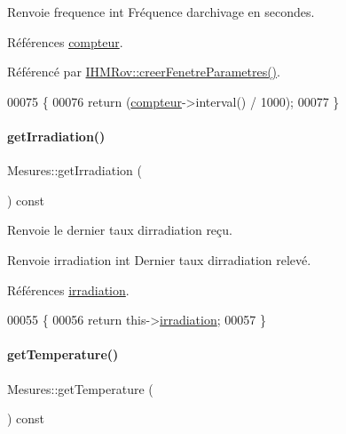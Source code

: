 \begin{DoxyReturn}{Renvoie}
frequence int Fréquence d\textquotesingle{}archivage en secondes. 
\end{DoxyReturn}


Références \hyperlink{class_mesures_a89af5f279d21cf10f5d6bd58bbc33173}{compteur}.



Référencé par \hyperlink{class_i_h_m_rov_aed451139ac09ef18b7c92637761d80ce}{I\+H\+M\+Rov\+::creer\+Fenetre\+Parametres()}.


\begin{DoxyCode}
00075 \{
00076     \textcolor{keywordflow}{return} (\hyperlink{class_mesures_a89af5f279d21cf10f5d6bd58bbc33173}{compteur}->interval() / 1000);
00077 \}
\end{DoxyCode}
\mbox{\label{class_mesures_af260c8f685e3519681b3ca0086d70b31}} 
\paragraph{\texorpdfstring{get\+Irradiation()}{getIrradiation()}}
{\footnotesize\ttfamily Mesures\+::get\+Irradiation (\begin{DoxyParamCaption}{ }\end{DoxyParamCaption}) const}

Renvoie le dernier taux d\textquotesingle{}irradiation reçu.

\begin{DoxyReturn}{Renvoie}
irradiation int Dernier taux d\textquotesingle{}irradiation relevé. 
\end{DoxyReturn}


Références \hyperlink{class_mesures_a77cde7672dac5e544b7288364ec7c7b5}{irradiation}.


\begin{DoxyCode}
00055 \{
00056     \textcolor{keywordflow}{return} this->\hyperlink{class_mesures_a77cde7672dac5e544b7288364ec7c7b5}{irradiation};
00057 \}
\end{DoxyCode}
\mbox{\label{class_mesures_a5e5e61c6bbdd2fd891b66ee494183dcd}} 
\paragraph{\texorpdfstring{get\+Temperature()}{getTemperature()}}
{\footnotesize\ttfamily Mesures\+::get\+Temperature (\begin{DoxyParamCaption}{ }\end{DoxyParamCaption}) const}

